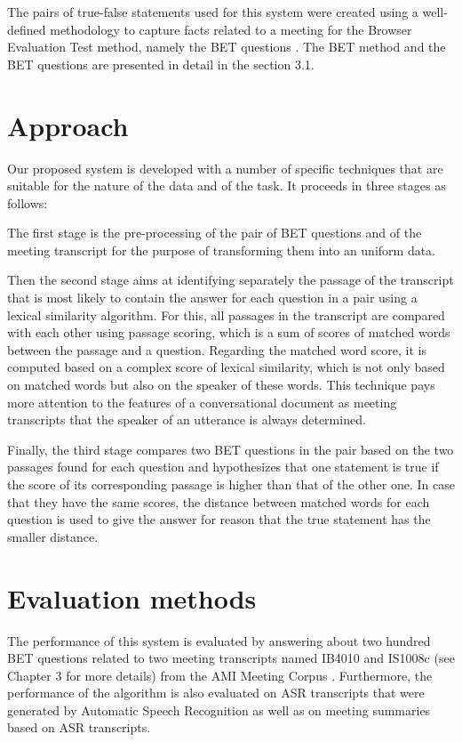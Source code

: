 The pairs of true-false statements used for this system were created using a well-defined methodology to capture facts related to a meeting for the Browser Evaluation Test method, namely the BET questions \cite{BET}. The BET method and the BET questions are presented in detail  in the section 3.1.







\section{Approach}
Our proposed system is developed with a number of specific techniques that are suitable for the nature of the data and of the task. It proceeds in three stages as follows: 

The first stage is the pre-processing of the pair of BET questions and of the meeting transcript for the purpose of transforming them into an uniform data.

Then the second stage aims at identifying separately the passage of the transcript that is most likely to contain the answer for each question in a pair using a lexical similarity algorithm. For this, all passages in the transcript are compared with each other using passage scoring, which is a sum of scores of matched words between the passage and a question. Regarding the matched word score, it is computed based on a complex score of lexical similarity, which is not only based on matched words but also on the speaker of these words. This technique pays more attention to the features of a conversational document as meeting transcripts that the speaker of an utterance is always determined. 
 
Finally, the third stage compares two BET questions in the pair based on the two passages found for each question and hypothesizes that one statement is true if the score of its corresponding passage is higher than that of the other one. In case that they have the same scores, the distance between matched words for each question is used to give the answer for reason that the true statement has the smaller distance. 


\section{Evaluation methods}
The performance of this system is evaluated by answering about two hundred BET questions related to two meeting transcripts named IB4010 and IS1008c (see Chapter 3 for more details) from the AMI Meeting Corpus \cite{AMI_corpus}. Furthermore, the performance of the algorithm is also evaluated on ASR transcripts that were generated by Automatic Speech Recognition \cite{ASR_transcrips} as well as on meeting summaries based on ASR transcripts.
 
